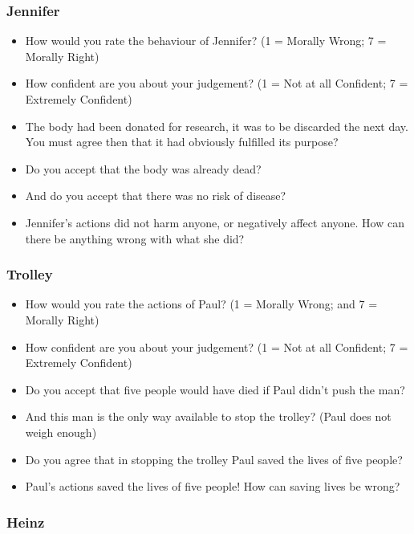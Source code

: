 \documentclass[
  man,floatsintext]{apa6}
\providecommand{\tightlist}{%
  \setlength{\itemsep}{0pt}\setlength{\parskip}{0pt}}
\begin{document}
\hypertarget{jennifer-1}{%
\subsubsection{Jennifer}\label{jennifer-1}}

\begin{itemize}
\tightlist
\item
  How would you rate the behaviour of Jennifer? (1 = Morally Wrong; 7 = Morally Right)
\item
  How confident are you about your judgement? (1 = Not at all Confident; 7 = Extremely Confident)
\item
  The body had been donated for research, it was to be discarded the next day. You must agree then that it had obviously fulfilled its purpose?
\item
  Do you accept that the body was already dead?
\item
  And do you accept that there was no risk of disease?
\item
  Jennifer's actions did not harm anyone, or negatively affect anyone. How can there be anything wrong with what she did?
\end{itemize}

\hypertarget{trolley-1}{%
\subsubsection{Trolley}\label{trolley-1}}

\begin{itemize}
\tightlist
\item
  How would you rate the actions of Paul? (1 = Morally Wrong; and 7 = Morally Right)
\item
  How confident are you about your judgement? (1 = Not at all Confident; 7 = Extremely Confident)
\item
  Do you accept that five people would have died if Paul didn't push the man?
\item
  And this man is the only way available to stop the trolley? (Paul does not weigh enough)
\item
  Do you agree that in stopping the trolley Paul saved the lives of five people?
\item
  Paul's actions saved the lives of five people! How can saving lives be wrong?
\end{itemize}

\hypertarget{heinz-1}{%
\subsubsection{Heinz}\label{heinz-1}}
\end{document}
